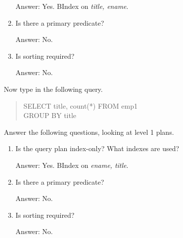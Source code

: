 \begin{enumerate}
\begin{enumerate}
Answer: Yes. BIndex on {\em title, ename}.

\item
Is there a primary predicate?

Answer: No.

\item
Is sorting required?

Answer: No.

\end{enumerate}

Now type in the following query.
\begin{quote}
        SELECT title, count(*) FROM emp1\\
        GROUP BY title
\end{quote}

Answer the following questions, looking at level 1 plans.
\begin{enumerate}
\item
Is the query plan index-only?  What indexes are used?

Answer: Yes. BIndex on {\em ename, title}.

\item
Is there a primary predicate?

Answer: No.

\item
Is sorting required?

Answer: No.

\end{enumerate}

\end{enumerate}


